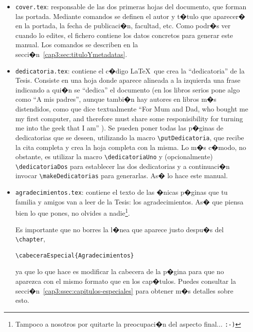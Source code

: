 \begin{itemize}
\item \texttt{cover.tex}: responsable de las dos primeras hojas del
  documento, que forman las portada. Mediante comandos se definen el
  autor y t�tulo que aparecer� en la portada, la fecha de publicaci�n,
  facultad, etc. Como podr�s ver cuando lo edites, el fichero contiene
  los datos concretos para generar este manual. Los comandos se
  describen en la secci�n~\ref{cap3:sec:tituloYmetadatas}.

\item \texttt{dedicatoria.tex}: contiene el c�digo \LaTeX\ que crea la
  ``dedicatoria'' de la Tesis. Consiste en una hoja donde aparece
  alineada a la izquierda una frase indicando a qui�n se ``dedica'' el
  documento (en los libros serios pone algo como ``A mis padres'',
  aunque tambi�n hay autores en libros m�s distendidos, como
  \citeauthor{AIbyExample} que dice textualmente ``For Mum and Dad,
  who bought me my first computer, and therefore must share some
  responisibility for turning me into the geek that I am''
  \citep{AIbyExample}). Se pueden poner todas las p�ginas de
  dedicatorias que se deseen, utilizando la macro
  \verb|\putDedicatoria|, que recibe la cita completa y crea la hoja
  completa con la misma. Lo m�s c�modo, no obstante, es utilizar la
  macro \verb|\dedicatoriaUno| y (opcionalmente)
  \verb|\dedicatoriaDos| para establecer las dos dedicatorias y a
  continuaci�n invocar \verb|\makeDedicatorias| para generarlas. As�
  lo hace este manual.

\item \texttt{agradecimientos.tex}: contiene el texto de las �nicas
  p�ginas que tu familia y amigos van a leer de la Tesis: los
  agradecimientos. As� que piensa bien lo que pones, no olvides a
  nadie\footnote{Tampoco a nosotros por quitarte la preocupaci�n del
    aspecto final... \texttt{:-)}}.

  Es importante que no borres la l�nea que aparece justo despu�s del
  \verb|\chapter|,

\begin{verbatim}
\cabeceraEspecial{Agradecimientos}
\end{verbatim}

  ya que lo que hace es modificar la cabecera de la p�gina para que no
  aparezca con el mismo formato que en los cap�tulos. Puedes consultar
  la secci�n~\ref{cap3:ssec:capitulos-especiales} para obtener m�s
  detalles sobre esto.


\end{itemize}
